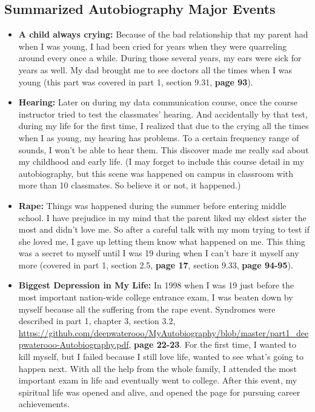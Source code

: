 \documentclass[9pt,b5paper]{article}
\begin{document}
\subsection{Summarized Autobiography Major Events}
\label{sec-9-1}
\begin{itemize}
\item \textbf{A child always crying:} Because of the bad relationship that my parent had when I was young, I had been cried for years when they were quarreling around every once a while. During those several years, my ears were sick for years as well. My dad brought me to see doctors all the times when I was young (this part was covered in part 1, section 9.31, \textbf{page 93}).
\item \textbf{Hearing:}  Later on during my data communication course, once the course instructor tried to test the classmates' hearing. And accidentally by that test, during my life for the first time, I realized that due to the crying all the times when I as young, my hearing has problems. To a certain frequency range of sounds, I won't be able to hear them. This discover made me really sad about my childhood and early life. (I may forget to include this course detail in my autobiography, but this scene was happened on campus in classroom with more than 10 classmates. So believe it or not, it happened.)
\item \textbf{Rape:} Things was happened during the summer before entering middle school. I have prejudice in my mind that the parent liked my eldest sister the most and didn't love me. So after a careful talk with my mom trying to test if she loved me, I gave up letting them know what happened on me. This thing was a secret to myself until I was 19 during when I can't bare it myself any more (covered in part 1, section 2.5, \textbf{page 17}, section 9.33, \textbf{page 94-95}).
\item \textbf{Biggest Depression in My Life:} In 1998 when I was 19 just before the most important nation-wide college entrance exam, I was beaten down by myself because all the suffering from the rape event. Syndromes were described in part 1, chapter 3, section 3.2, \url{https://github.com/deepwaterooo/MyAutobiography/blob/master/part1_deepwaterooo-Autobiography.pdf}, \textbf{page 22-23}. For the first time, I wanted to kill myself, but I failed because I still love life, wanted to see what's going to happen next. With all the help from the whole family, I attended the most important exam in life and eventually went to college. After this event, my spiritual life was opened and alive, and opened the page for pursuing career achievements.

\end{itemize}
\end{document}
